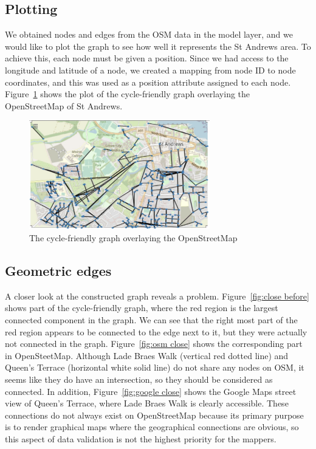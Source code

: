 \documentclass[12pt,a4paper]{report}
\begin{document}
\subsection{Plotting}
We obtained nodes and edges from the OSM data in the model layer, and we would like to plot the graph to see how well it represents the St Andrews area. To achieve this, each node must be given a position. Since we had access to the longitude and latitude of a node, we created a mapping from node ID to node coordinates, and this was used as a position attribute assigned to each node. Figure~\ref{fig:graph layout} shows the plot of the cycle-friendly graph overlaying the OpenStreetMap of St Andrews.

\begin{figure}[ht]
    \centering
    \includegraphics[width=0.7\textwidth]{diss_images/impl/graph_layout.png}
    \caption{The cycle-friendly graph overlaying the OpenStreetMap}
    \label{fig:graph layout}
\end{figure}

\subsection{Geometric edges}
A closer look at the constructed graph reveals a problem. Figure~\ref{fig:close before} shows part of the cycle-friendly graph, where the red region is the largest connected component in the graph. We can see that the right most part of the red region appears to be connected to the edge next to it, but they were actually not connected in the graph. Figure~\ref{fig:osm close} shows the corresponding part in OpenSteetMap. Although Lade Braes Walk (vertical red dotted line) and Queen's Terrace (horizontal white solid line) do not share any nodes on OSM, it seems like they do have an intersection, so they should be considered as connected. In addition, Figure~\ref{fig:google close} shows the Google Maps street view of Queen's Terrace, where Lade Braes Walk is clearly accessible. These connections do not always exist on OpenStreetMap because its primary purpose is to render graphical maps where the geographical connections are obvious, so this aspect of data validation is not the highest priority for the mappers.
\end{document}
